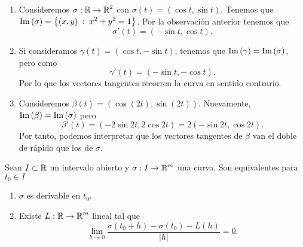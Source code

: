 \begin{eg}
\begin{enumerate}
	\item Consideremos $\displaystyle \sigma : \mathbb{R} \to \mathbb{R}^{2} $ con $\displaystyle \sigma\left(t\right) = \left(\cos t, \sin t\right) $. Tenemos que $\displaystyle \operatorname{Im}\left(\sigma \right) = \left\{ \left(x,y\right) \; : \; x^{2} +y^{2} = 1\right\}  $. Por la observación anterior tenemos que
		\[\sigma'\left(t\right) = \left(-\sin t, \cos t\right) .\]
	\item Si consideramos $\displaystyle \gamma\left(t\right) = \left(\cos t, - \sin t\right) $, tenemos que $\displaystyle \operatorname{Im}\left(\gamma \right) = \operatorname{Im}\left(\sigma \right) $, pero como 
		\[\gamma ' \left(t\right) = \left(-\sin t, - \cos t\right) .\]
		Por lo que los vectores tangentes recorren la curva en sentido contrario.
	\item Consideremos $\displaystyle \beta\left(t\right) = \left(\cos\left(2t\right), \sin\left(2t\right)\right) $. Nuevamente, $\displaystyle \operatorname{Im}\left(\beta \right) = \operatorname{Im}\left(\sigma \right) $ pero 
		\[\beta'\left(t\right) = \left(-2\sin 2t, 2\cos2t\right) = 2\left(-\sin2t, \cos2t\right) .\]
		Por tanto, podemos interpretar que los vectores tangentes de $\displaystyle \beta  $ van el doble de rápido que los de $\displaystyle \sigma  $.
\end{enumerate}
\end{eg}
\begin{theorem}
Sean $\displaystyle I \subset \mathbb{R} $ un intervalo abierto y $\displaystyle \sigma : I \to \mathbb{R}^{m} $ una curva. Son equivalentes para $\displaystyle t_{0} \in I $
\begin{enumerate}
\item $\displaystyle \sigma  $ es derivable en $\displaystyle t_{0} $.
\item Existe $\displaystyle L : \mathbb{R} \to \mathbb{R}^{m} $ lineal tal que 
	\[\lim_{h \to 0}\frac{\sigma\left(t_{0}+h\right)-\sigma\left(t_{0}\right)-L\left(h\right)}{ \left|h\right|} = 0 .\]
\end{enumerate}
\end{theorem}
